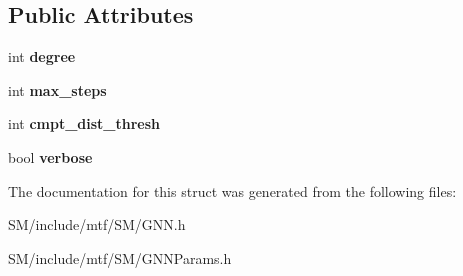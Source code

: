 \subsection*{Public Attributes}
\begin{DoxyCompactItemize}
\item 
\hypertarget{structgnn_1_1GNNParams_ae23925798a97275ddf231e8f159e564e}{int {\bfseries degree}}\label{structgnn_1_1GNNParams_ae23925798a97275ddf231e8f159e564e}

\item 
\hypertarget{structgnn_1_1GNNParams_adeb934339aaaa3338573717b5310f8bf}{int {\bfseries max\-\_\-steps}}\label{structgnn_1_1GNNParams_adeb934339aaaa3338573717b5310f8bf}

\item 
\hypertarget{structgnn_1_1GNNParams_a65ce004484c30e95c3a0882b3e947c40}{int {\bfseries cmpt\-\_\-dist\-\_\-thresh}}\label{structgnn_1_1GNNParams_a65ce004484c30e95c3a0882b3e947c40}

\item 
\hypertarget{structgnn_1_1GNNParams_a86829c23acb6d7b6a95c8c568116f1a4}{bool {\bfseries verbose}}\label{structgnn_1_1GNNParams_a86829c23acb6d7b6a95c8c568116f1a4}

\end{DoxyCompactItemize}


The documentation for this struct was generated from the following files\-:\begin{DoxyCompactItemize}
\item 
S\-M/include/mtf/\-S\-M/G\-N\-N.\-h\item 
S\-M/include/mtf/\-S\-M/G\-N\-N\-Params.\-h\end{DoxyCompactItemize}
